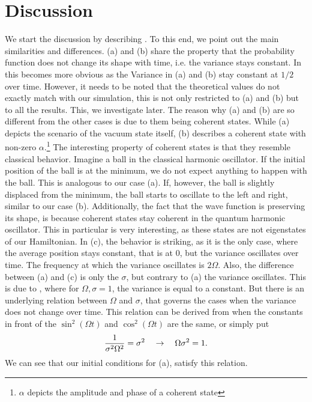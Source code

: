 \section{Discussion}

We start the discussion by describing . To this end, we point out the main similarities and differences. (a) and (b) share the property that the probability function does not change its shape with time, i.e. the variance stays constant. In  this becomes more obvious as the Variance in (a) and (b) stay constant at $1/2$ over time. However, it needs to be noted that the theoretical values do not exactly match with our simulation, this is not only restricted to (a) and (b) but to all the results. This, we investigate later. The reason why (a) and (b) are so different from the other cases is due to them being coherent states. While (a) depicts the scenario of the vacuum state itself, (b) describes a coherent state with non-zero $\alpha$.\footnote{$\alpha$ depicts the amplitude and phase of a coherent state} The interesting property of coherent states is that they resemble classical behavior. Imagine a ball in the classical harmonic oscillator. If the initial position of the ball is at the minimum, we do not expect anything to happen with the ball. This is analogous to our case (a). If, however, the ball is slightly displaced from the minimum, the ball starts to oscillate to the left and right, similar to our case (b). Additionally, the fact that the wave function is preserving its shape, is because coherent states stay coherent in the quantum harmonic oscillator. This in particular is very interesting, as these states are not eigenstates of our Hamiltonian. In (c), the behavior is striking, as it is the only case, where the average position stays constant, that is at 0, but the variance oscillates over time. The frequency at which the variance oscillates is $2\Omega$. Also, the difference between (a) and (c) is only the $\sigma$, but contrary to (a) the variance oscillates. This is due to , where for $\Omega,\sigma = 1$, the variance is equal to a constant. But there is an underlying relation between $\Omega$ and $\sigma$, that governs the cases when the variance does not change over time. This relation can be derived from  when the constants in front of the $\sin^2(\Omega t)$ and $\cos^2(\Omega t)$ are the same, or simply put
\begin{equation}
	{1\over \sigma^2 \Omega^2} = \sigma^2 \quad \rightarrow \quad \Omega \sigma^2 = 1.
\end{equation}
We can see that our initial conditions for (a), satisfy this relation.\\

